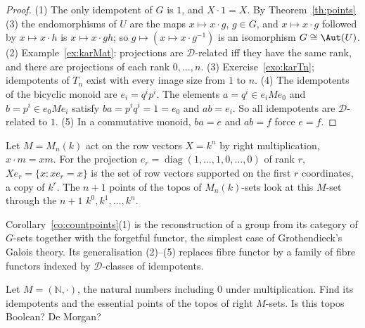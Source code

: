 \begin{proof}
(1) The only idempotent of $G$ is $1$, and $X\cdot 1 = X$. By Theorem~\ref{th:points}(3) the endomorphisms of $U$ are the maps $x\mapsto x\cdot g$, $g\in G$, and $x\mapsto x\cdot g$ followed by $x\mapsto x\cdot h$ is $x\mapsto x\cdot gh$; so $g\mapsto(x\mapsto x\cdot g^{-1})$ is an isomorphism $G\cong\Aut(U)$.
(2) Example~\ref{ex:karMat}: projections are $\mathcal D$-related iff they have the same rank, and there are projections of each rank $0,\dots,n$.
(3) Exercise~\ref{exo:karTn}; idempotents of $T_n$ exist with every image size from $1$ to $n$.
(4) The idempotents of the bicyclic monoid are $e_i = q^ip^i$. The elements $a = q^i\in e_iMe_0$ and $b = p^i\in e_0Me_i$ satisfy $ba = p^iq^i = 1 = e_0$ and $ab = e_i$. So all idempotents are $\mathcal D$-related to $1$.
(5) In a commutative monoid, $ba = e$ and $ab = f$ force $e = f$.
\end{proof}

\begin{example}
Let $M = M_n(k)$ act on the row vectors $X = k^n$ by right multiplication, $x\cdot m = xm$. For the projection $e_r = \operatorname{diag}(1,\dots,1,0,\dots,0)$ of rank $r$, $Xe_r = \{x : xe_r = x\}$ is the set of row vectors supported on the first $r$ coordinates, a copy of $k^r$. The $n+1$ points of the topos of $M_n(k)$-sets look at this $M$-set through the $n+1$  $k^0, k^1,\dots,k^n$.
\end{example}

\begin{remark}
Corollary~\ref{co:countpoints}(1) is the reconstruction of a group from its category of $G$-sets together with the forgetful functor, the simplest case of Grothendieck's Galois theory. Its generalisation (2)--(5) replaces  fibre functor by a family of fibre functors indexed by $\mathcal D$-classes of idempotents.
\end{remark}

\begin{exercise}\label{exo:Nmult}
Let $M = (\mathbb N,\cdot)$, the natural numbers including $0$ under multiplication. Find its idempotents and the essential points of the topos of right $M$-sets. Is this topos Boolean? De Morgan?
\end{exercise}
